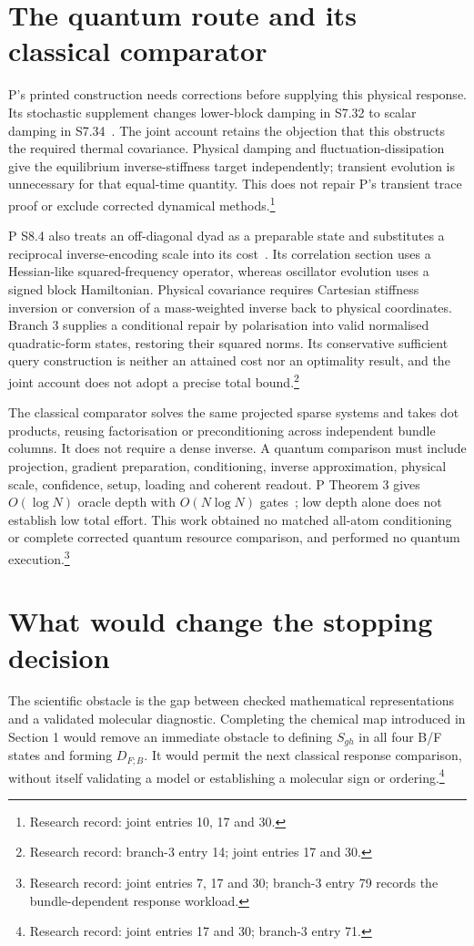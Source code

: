 \documentclass{article}
\begin{document}
\section{The quantum route and its classical comparator}
P's printed construction needs corrections before supplying this physical response. Its stochastic supplement changes lower-block damping in S7.32 to scalar damping in S7.34~\cite{P}. The joint account retains the objection that this obstructs the required thermal covariance. Physical damping and fluctuation-dissipation give the equilibrium inverse-stiffness target independently; transient evolution is unnecessary for that equal-time quantity. This does not repair P's transient trace proof or exclude corrected dynamical methods.\footnote{Research record: joint entries 10, 17 and 30.}

P S8.4 also treats an off-diagonal dyad as a preparable state and substitutes a reciprocal inverse-encoding scale into its cost~\cite{P}. Its correlation section uses a Hessian-like squared-frequency operator, whereas oscillator evolution uses a signed block Hamiltonian. Physical covariance requires Cartesian stiffness inversion or conversion of a mass-weighted inverse back to physical coordinates. Branch 3 supplies a conditional repair by polarisation into valid normalised quadratic-form states, restoring their squared norms. Its conservative sufficient query construction is neither an attained cost nor an optimality result, and the joint account does not adopt a precise total bound.\footnote{Research record: branch-3 entry 14; joint entries 17 and 30.}

The classical comparator solves the same projected sparse systems and takes dot products, reusing factorisation or preconditioning across independent bundle columns. It does not require a dense inverse. A quantum comparison must include projection, gradient preparation, conditioning, inverse approximation, physical scale, confidence, setup, loading and coherent readout. P Theorem 3 gives \(O(\log N)\) oracle depth with \(O(N\log N)\) gates~\cite{P}; low depth alone does not establish low total effort. This work obtained no matched all-atom conditioning or complete corrected quantum resource comparison, and performed no quantum execution.\footnote{Research record: joint entries 7, 17 and 30; branch-3 entry 79 records the bundle-dependent response workload.}

\section{What would change the stopping decision}
The scientific obstacle is the gap between checked mathematical representations and a validated molecular diagnostic. Completing the chemical map introduced in Section 1 would remove an immediate obstacle to defining \(S_{gh}\) in all four B/F states and forming \(D_{F;B}\). It would permit the next classical response comparison, without itself validating a model or establishing a molecular sign or ordering.\footnote{Research record: joint entries 17 and 30; branch-3 entry 71.}
\end{document}
